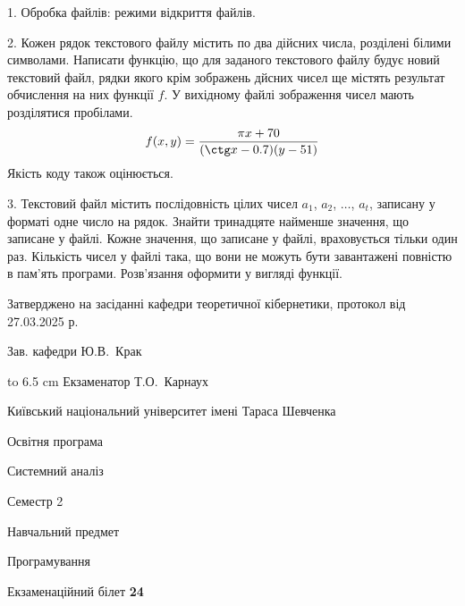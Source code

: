 \documentclass[12pt, ukrainian]{article}
\begin{document}
{%
1. Обробка файлів: режими відкриття файлів.%
\par
\vspace{2mm}

2. Кожен рядок текстового файлу містить по два дійсних числа, розділені білими символами.
Написати функцію, що для заданого текстового файлу будує новий текстовий файл, рядки якого крім зображень дйсних чисел ще містять результат обчислення на них функції $f$. У вихідному файлі зображення чисел мають розділятися пробілами. 
$$f(x, y) =\frac{\pi x + 70}{(\ctg x - 0.7) (y - 51)}$$ 
Якість коду також оцінюється.

\par
\vspace{2mm}

3. Текстовий файл містить послідовність цілих чисел $a_1$, $a_2$, $\ldots$, $a_t$, записану у форматі одне число на рядок. Знайти тринадцяте найменше значення, що записане у файлі. Кожне значення, що записане у файлі, враховується тільки один раз. Кількість чисел у файлі така, що вони не можуть бути завантажені повністю в пам'ять програми. Розв'язання оформити у вигляді функції.

}
{\smallskip\smallskip \begin {scriptsize} Затверджено на засіданні кафедри теоретичної кібернетики, протокол   від   27.03.2025 р.\par\smallskip\smallskip\smallskip\smallskip
{\parbox {6.5 cm} {Зав. кафедри \dotfill Ю.В.~Крак}}\hspace {0.7cm} {\hbox to 6.5 cm { Екзаменатор \dotfill Т.О.~Карнаух}} \end{scriptsize}}
\vspace{2.9cm}
{{\begin {scriptsize}\par
{ \center  Київський національний університет імені Тараса Шевченка \par}
{\parbox {5 cm}{Освітня програма \hfill}{\parbox {7 cm}{Системний аналіз\hfill}}\parbox {6 cm}{\hfill Семестр 2}}\par
{\parbox {5 cm} {Навчальний предмет \hfill}\parbox {7 cm}{Програмування \hfill}\parbox {6cm}{\hfill}\par}\vspace{-15pt} \end{scriptsize}}{\center Екзаменаційний білет \No \textbf { 24 }\par}}
\end{document}
